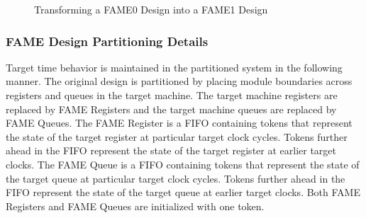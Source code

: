 \begin{figure}
	\centering
    \caption{Transforming a FAME0 Design into a FAME1 Design}
	\label{fig:fame-partition}
\end{figure}

\subsubsection{FAME Design Partitioning Details}
Target time behavior is maintained in the partitioned system in the following manner. The original design is partitioned by placing module boundaries across registers and queues in the target machine. The target machine registers are replaced by FAME Registers and the target machine queues are replaced by FAME Queues. The FAME Register is a FIFO containing tokens that represent the state of the target register at particular target clock cycles. Tokens further ahead in the FIFO represent the state of the target register at earlier target clocks. The FAME Queue is a FIFO containing tokens that represent the state of the target queue at particular target clock cycles. Tokens further ahead in the FIFO represent the state of the target queue at earlier target clocks. Both FAME Registers and FAME Queues are initialized with one token. 

